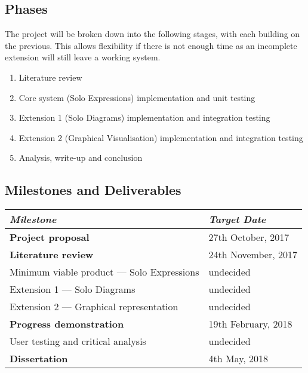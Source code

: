\documentclass{article}
\begin{document}
\subsection{Phases}
The project will be broken down into the following stages, with each building on the previous. This allows flexibility if there is not enough time as an incomplete extension will still leave a working system.
\begin{enumerate}
	\item Literature review
	\item Core system (Solo Expressions) implementation and unit testing
	\item Extension 1 (Solo Diagrams) implementation and integration testing
	\item Extension 2 (Graphical Visualisation) implementation and integration testing
	\item Analysis, write-up and conclusion
\end{enumerate}

\subsection{Milestones and Deliverables}
\begin{center}
	\begin{tabular}{ l l }
		\toprule
		\textit{Milestone} & \textit{Target Date} \\
		\midrule
		\textbf{Project proposal} & {27th October, 2017} \\
		\textbf{Literature review} & {24th November, 2017} \\
		{Minimum viable product --- Solo Expressions} & {undecided} \\
		{Extension 1 --- Solo Diagrams} & {undecided} \\
		{Extension 2 --- Graphical representation} & {undecided} \\
		\textbf{Progress demonstration} & {19th February, 2018} \\
		{User testing and critical analysis} & {undecided} \\
		\textbf{Dissertation} & {4th May, 2018} \\
		\bottomrule
	\end{tabular}
\end{center}
\end{document}
